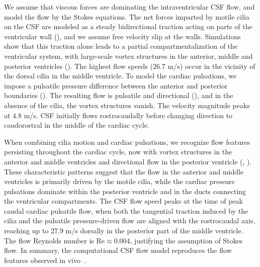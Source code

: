 \documentclass{WileyMSP-template}
\begin{document}
We assume that viscous forces are dominating the intraventricular CSF flow,
and model the flow by the Stokes equations.
The net forces imparted by motile cilia on the CSF are modeled as a steady
bidirectional traction acting on parts of the ventricular wall
(), and we assume free velocity slip at the walls.
Simulations show that this traction alone
leads to a partial compartmentalization of the ventricular system,
with large-scale vortex structures in the anterior, middle and
posterior ventricles (). The highest flow
speeds ($26.7$ \textmu m/s) occur in the vicinity of the dorsal cilia
in the middle ventricle. To model the cardiac pulsations, we impose a
pulsatile pressure difference between the anterior and posterior
boundaries (). The resulting flow
is pulsatile and directional (), and
in the absence of the cilia, the vortex structures vanish. The
velocity magnitude peaks at $4.8$ \textmu m/s. CSF initially flows
rostrocaudally before changing direction to caudorostral in the middle
of the cardiac cycle.

When combining cilia motion and cardiac pulsations, we recognize flow features
persisting throughout the cardiac cycle, now with vortex structures in
the anterior and middle ventricles and directional flow in the
posterior ventricle (, ). These characteristic patterns suggest that the flow in
the anterior and middle ventricles is primarily driven by the motile
cilia, while the cardiac pressure pulsations dominate within the
posterior ventricle and in the ducts connecting the ventricular
compartments. The CSF flow speed peaks at the time of peak caudal
cardiac pulsatile flow, when both the tangential traction induced by
the cilia and the pulsatile pressure-driven flow are aligned with the
rostrocaudal axis, reaching up to 27.9 \textmu m/s dorsally in the
posterior part of the middle ventricle. The flow Reynolds number is
$\mathrm{Re} \approx 0.004$, justifying the assumption of Stokes
flow. In summary, the computational CSF flow model reproduces the flow
features observed in vivo~\cite{Olstad2019CiliaryDevelopment}.
\end{document}
